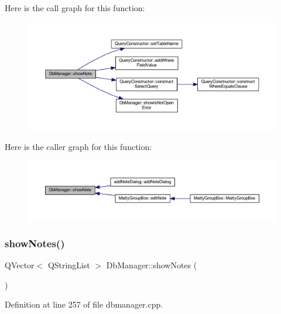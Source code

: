 Here is the call graph for this function\+:
\nopagebreak
\begin{figure}[H]
\begin{center}
\leavevmode
\includegraphics[width=350pt]{classDbManager_a51a53e4f7776ca83da7fafe7036adf17_cgraph}
\end{center}
\end{figure}
Here is the caller graph for this function\+:
\nopagebreak
\begin{figure}[H]
\begin{center}
\leavevmode
\includegraphics[width=350pt]{classDbManager_a51a53e4f7776ca83da7fafe7036adf17_icgraph}
\end{center}
\end{figure}
\hypertarget{classDbManager_a67826fcd32d3921d1d1ae32ff3e9ce5d}{}\label{classDbManager_a67826fcd32d3921d1d1ae32ff3e9ce5d} 
\subsubsection{\texorpdfstring{show\+Notes()}{showNotes()}\hspace{0.1cm}{\footnotesize\ttfamily [1/2]}}
{\footnotesize\ttfamily Q\+Vector$<$ Q\+String\+List $>$ Db\+Manager\+::show\+Notes (\begin{DoxyParamCaption}{ }\end{DoxyParamCaption})\hspace{0.3cm}{\ttfamily [static]}}



Definition at line 257 of file dbmanager.\+cpp.

